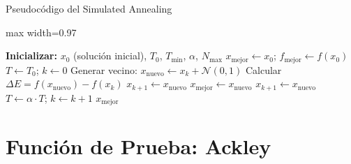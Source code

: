 \documentclass[aspectratio=169,xcolor=dvipsnames]{beamer}
\begin{document}
\begin{frame}{Pseudocódigo del Simulated Annealing}
\begin{adjustbox}{max width=0.97\textwidth}
\begin{minipage}{\textwidth}
\begin{algorithm}[H]
\tiny
\caption{Simulated Annealing}
\begin{algorithmic}[1]
    \State \textbf{Inicializar:} $x_0$ (solución inicial), $T_0$, $T_{\min}$, $\alpha$, $N_{\max}$
    \State $x_{\text{mejor}} \leftarrow x_0$; \quad $f_{\text{mejor}} \leftarrow f(x_0)$
    \State $T \leftarrow T_0$; \quad $k \leftarrow 0$
        \State Generar vecino: $x_{\text{nuevo}} \leftarrow x_k + \mathcal{N}(0,1)$
        \State Calcular $\Delta E = f(x_{\text{nuevo}}) - f(x_k)$
            \State $x_{k+1} \leftarrow x_{\text{nuevo}}$ 
                \State $x_{\text{mejor}} \leftarrow x_{\text{nuevo}}$
            \EndIf
        \Else
                \State $x_{k+1} \leftarrow x_{\text{nuevo}}$ 
            \EndIf
        \EndIf
        \State $T \leftarrow \alpha \cdot T$; \quad $k \leftarrow k + 1$
    \EndWhile
    \State \Return $x_{\text{mejor}}$
\end{algorithmic}
\end{algorithm}
\end{minipage}
\end{adjustbox}
\end{frame}

\section{Función de Prueba: Ackley}
\end{document}
